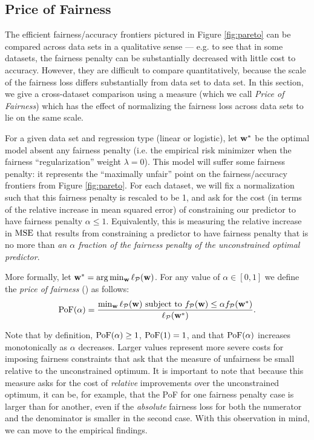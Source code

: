 \newcommand{\C}{\mathcal{C}\xspace}
\subsection{Price of Fairness}
\label{sec:comparison}

The efficient fairness/accuracy frontiers pictured in Figure
\ref{fig:pareto} can be compared across data sets in a qualitative
sense --- e.g. to see that in some datasets, the fairness penalty can
be substantially decreased with little cost to accuracy. However, they
are difficult to compare quantitatively, because the scale of the
fairness loss differs substantially from data set to data set. In this
section, we give a cross-dataset comparison using a measure (which we
call {\em Price of Fairness\/}) which has the effect of normalizing
the fairness loss across data sets to lie on the same scale.

For a given data set and regression type (linear or logistic), let
$\mathbf{w}^*$ be the optimal model absent any fairness penalty (i.e. the
empirical risk minimizer when the fairness ``regularization'' weight
$\lambda = 0$). This model will suffer some fairness penalty: it
represents the ``maximally unfair'' point on the fairness/accuracy
frontiers from Figure \ref{fig:pareto}. For each dataset, we will fix
a normalization such that this fairness penalty is rescaled to be 1,
and ask for the cost (in terms of the relative increase in mean
squared error) of constraining our predictor to have fairness penalty
$\alpha \leq 1$. Equivalently, this is measuring the relative increase
in $\textrm{MSE}$ that results from constraining a predictor to have fairness
penalty that is no more than \emph{an $\alpha$ fraction of the
  fairness penalty of the unconstrained optimal predictor}.

More formally, let $\mathbf{w}^* = \arg\min_{\mathbf{w}} \ell_{\mathcal{P}}(\mathbf{w})$.
For any value of $\alpha\in[0,1]$ we define the \emph{price of fairness}
(\pof) as follows:
\[
\text{\textrm{PoF}}(\alpha) = \frac{\min_{\mathbf{w}} \ell_{\mathcal{P}}(\mathbf{w}) \text{ subject to }   f_{\mathcal{P}}(\mathbf{w}) \leq \alpha  f_{\mathcal{P}}(\mathbf{w}^*) }{\ell_{\mathcal{P}}(\mathbf{w}^*)}.
\]

Note that by definition, $\textrm{PoF}(\alpha) \geq 1$, $\textrm{PoF}(1) = 1$, and that $\textrm{PoF}(\alpha)$ increases monotonically as $\alpha$ decreases. Larger values represent more severe costs for imposing fairness constraints that ask that the measure of unfairness be small relative to the unconstrained optimum. It is important to note that because this measure asks for the cost of \emph{relative} improvements over the unconstrained optimum, it can be, for example, that the PoF for one fairness penalty case is larger than for another, even if the \emph{absolute} fairness loss for both the numerator and the denominator is smaller in the second case. With this observation in mind, we can move to the empirical findings.

